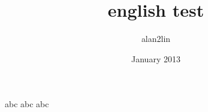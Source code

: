 \documentclass[a4paper,12pt]{book}
\begin{document}
\author{alan2lin}
\title{english test}
\date{January 2013}

\frontmatter
\maketitle
\tableofcontents

\mainmatter



abc
abc 
abc
\backmatter
\end{document}
